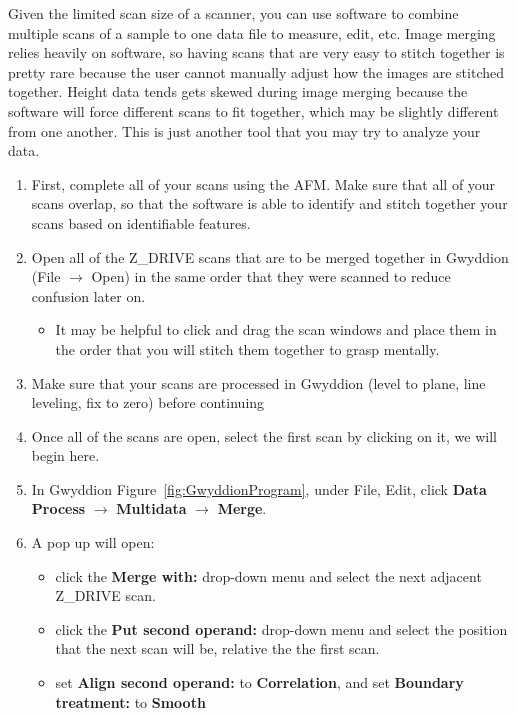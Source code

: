 \documentclass{../lab}
\begin{document}
Given the limited scan size of a scanner, you can use software to combine multiple scans of a sample to one data file to measure, edit, etc.  Image merging relies heavily on software, so having scans that are very easy to stitch together is pretty rare because the user cannot manually adjust how the images are stitched together.  Height data tends gets skewed during image merging because the software will force different scans to fit together, which may be slightly different from one another.  This is just another tool that you may try to analyze your data.
\begin{enumerate}
    \item First, complete all of your scans using the AFM.  Make sure that all of your scans overlap, so that the software is able to identify and stitch together your scans based on identifiable features.
    
    \item Open all of the Z\_DRIVE scans that are to be merged together in Gwyddion (File $\rightarrow$ Open) in the same order that they were scanned to reduce confusion later on.
    \begin{itemize}
        \item It may be helpful to click and drag the scan windows and place them in the order that you will stitch them together to grasp mentally.
    \end{itemize}
    
    \item Make sure that your scans are processed in Gwyddion (level to plane, line leveling, fix to zero) before continuing
    
    \item Once all of the scans are open, select the first scan by clicking on it, we will begin here.
    
    \item In Gwyddion Figure~\ref{fig:GwyddionProgram}, under File, Edit, click \textbf{Data Process} $\rightarrow$ \textbf{Multidata }$\rightarrow$ \textbf{Merge}.
    
    \item A pop up will open:
    \begin{itemize}
        \item click the \textbf{Merge with:} drop-down menu and select the next adjacent Z\_DRIVE scan.
        \item click the \textbf{Put second operand:} drop-down menu and select the position that the next scan will be, relative the the first scan.
        \item set \textbf{Align second operand:} to \textbf{Correlation}, and set \textbf{Boundary treatment:} to \textbf{Smooth}
    \end{itemize}
    

\end{enumerate}
\end{document}
